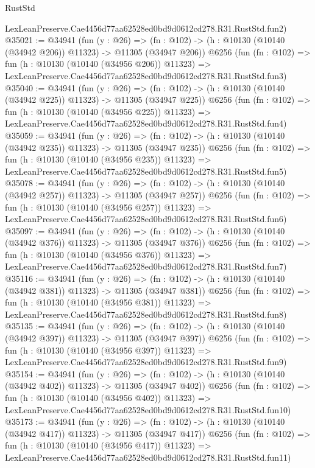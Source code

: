 \begin{lexlean}{RustStd}
\begin{coremodule}
    LexLeanPreserve.Cae4456d77aa62528ed0bd9d0612cd278.R31.RustStd.fun2)
@35021 := @34941
    (fun (y : @26) =>
    (fn : @102) -> (h : @10130 (@10140 (@34942 @206)) @11323) -> @11305 (@34947 @206))
    @6256
    (fun (fn : @102) =>
    fun (h : @10130 (@10140 (@34956 @206)) @11323) =>
    LexLeanPreserve.Cae4456d77aa62528ed0bd9d0612cd278.R31.RustStd.fun3)
@35040 := @34941
    (fun (y : @26) =>
    (fn : @102) -> (h : @10130 (@10140 (@34942 @225)) @11323) -> @11305 (@34947 @225))
    @6256
    (fun (fn : @102) =>
    fun (h : @10130 (@10140 (@34956 @225)) @11323) =>
    LexLeanPreserve.Cae4456d77aa62528ed0bd9d0612cd278.R31.RustStd.fun4)
@35059 := @34941
    (fun (y : @26) =>
    (fn : @102) -> (h : @10130 (@10140 (@34942 @235)) @11323) -> @11305 (@34947 @235))
    @6256
    (fun (fn : @102) =>
    fun (h : @10130 (@10140 (@34956 @235)) @11323) =>
    LexLeanPreserve.Cae4456d77aa62528ed0bd9d0612cd278.R31.RustStd.fun5)
@35078 := @34941
    (fun (y : @26) =>
    (fn : @102) -> (h : @10130 (@10140 (@34942 @257)) @11323) -> @11305 (@34947 @257))
    @6256
    (fun (fn : @102) =>
    fun (h : @10130 (@10140 (@34956 @257)) @11323) =>
    LexLeanPreserve.Cae4456d77aa62528ed0bd9d0612cd278.R31.RustStd.fun6)
@35097 := @34941
    (fun (y : @26) =>
    (fn : @102) -> (h : @10130 (@10140 (@34942 @376)) @11323) -> @11305 (@34947 @376))
    @6256
    (fun (fn : @102) =>
    fun (h : @10130 (@10140 (@34956 @376)) @11323) =>
    LexLeanPreserve.Cae4456d77aa62528ed0bd9d0612cd278.R31.RustStd.fun7)
@35116 := @34941
    (fun (y : @26) =>
    (fn : @102) -> (h : @10130 (@10140 (@34942 @381)) @11323) -> @11305 (@34947 @381))
    @6256
    (fun (fn : @102) =>
    fun (h : @10130 (@10140 (@34956 @381)) @11323) =>
    LexLeanPreserve.Cae4456d77aa62528ed0bd9d0612cd278.R31.RustStd.fun8)
@35135 := @34941
    (fun (y : @26) =>
    (fn : @102) -> (h : @10130 (@10140 (@34942 @397)) @11323) -> @11305 (@34947 @397))
    @6256
    (fun (fn : @102) =>
    fun (h : @10130 (@10140 (@34956 @397)) @11323) =>
    LexLeanPreserve.Cae4456d77aa62528ed0bd9d0612cd278.R31.RustStd.fun9)
@35154 := @34941
    (fun (y : @26) =>
    (fn : @102) -> (h : @10130 (@10140 (@34942 @402)) @11323) -> @11305 (@34947 @402))
    @6256
    (fun (fn : @102) =>
    fun (h : @10130 (@10140 (@34956 @402)) @11323) =>
    LexLeanPreserve.Cae4456d77aa62528ed0bd9d0612cd278.R31.RustStd.fun10)
@35173 := @34941
    (fun (y : @26) =>
    (fn : @102) -> (h : @10130 (@10140 (@34942 @417)) @11323) -> @11305 (@34947 @417))
    @6256
    (fun (fn : @102) =>
    fun (h : @10130 (@10140 (@34956 @417)) @11323) =>
    LexLeanPreserve.Cae4456d77aa62528ed0bd9d0612cd278.R31.RustStd.fun11)

\end{coremodule}
\end{lexlean}
